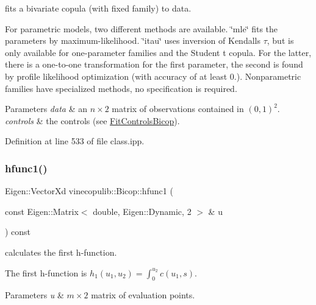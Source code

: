 fits a bivariate copula (with fixed family) to data. 

For parametric models, two different methods are available. {\ttfamily \char`\"{}mle\char`\"{}} fits the parameters by maximum-\/likelihood. {\ttfamily \char`\"{}itau\char`\"{}} uses inversion of Kendall\textquotesingle{}s $ \tau $, but is only available for one-\/parameter families and the Student t copula. For the latter, there is a one-\/to-\/one transformation for the first parameter, the second is found by profile likelihood optimization (with accuracy of at least 0.). Nonparametric families have specialized methods, no specification is required.


\begin{DoxyParams}{Parameters}
{\em data} & an $ n \times 2 $ matrix of observations contained in $(0, 1)^2 $. \\
\hline
{\em controls} & the controls (see \hyperlink{classvinecopulib_1_1_fit_controls_bicop}{Fit\+Controls\+Bicop}). \\
\hline
\end{DoxyParams}


Definition at line 533 of file class.\+ipp.

\mbox{\label{classvinecopulib_1_1_bicop_ae6d42fab3bc19b807f41ccecfc80de46}} 
\subsubsection{\texorpdfstring{hfunc1()}{hfunc1()}}
{\footnotesize\ttfamily Eigen\+::\+Vector\+Xd vinecopulib\+::\+Bicop\+::hfunc1 (\begin{DoxyParamCaption}\item[{const Eigen\+::\+Matrix$<$ double, Eigen\+::\+Dynamic, 2 $>$ \&}]{u }\end{DoxyParamCaption}) const\hspace{0.3cm}{\ttfamily [inline]}}



calculates the first h-\/function. 

The first h-\/function is $ h_1(u_1, u_2) = \int_0^{u_2} c(u_1, s) $. 
\begin{DoxyParams}{Parameters}
{\em u} & $m \times 2$ matrix of evaluation points. \\
\hline
\end{DoxyParams}


